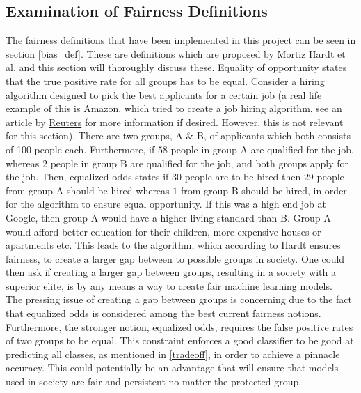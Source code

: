 \documentclass[11pt, fleqn, titlepage]{article}
\begin{document}
	\subsection{Examination of Fairness Definitions}\label{examination_of_fairness_definitions}
	The fairness definitions that have been implemented in this project can be seen in section \ref{bias_def}. These are definitions which are proposed by Mortiz Hardt et al. and this section will thoroughly discuss these. Equality of opportunity states that the true positive rate for all groups has to be equal. Consider a hiring algorithm designed to pick the best applicants for a certain job (a real life example of this is Amazon, which tried to create a job hiring algorithm, see an article by \href{https://www.reuters.com/article/us-amazon-com-jobs-automation-insight/amazon-scraps-secret-ai-recruiting-tool-that-showed-bias-against-women-idUSKCN1MK08G}{Reuters} for more information if desired. However, this is not relevant for this section). There are two groups, A \& B, of applicants which both consists of 100 people each. Furthermore, if $ 58 $ people in group A are qualified for the job, whereas $ 2 $ people in group B are qualified for the job, and both groups apply for the job. Then, equalized odds states if $ 30 $ people are to be hired then $ 29 $ people from group A should be hired whereas $ 1 $ from group B should be hired, in order for the algorithm to ensure equal opportunity. \cite{towardsdata} If this was a high end job at Google, then group A would have a higher living standard than B. Group A would afford better education for their children, more expensive houses or apartments etc. This leads to the algorithm, which according to Hardt ensures fairness, to create a larger gap between to possible groups in society. One could then ask if creating a larger gap between groups, resulting in a society with a superior elite, is by any means a way to create fair machine learning models. \newline
	\\
	\noindent 
	The pressing issue of creating a gap between groups is concerning due to the fact that equalized odds is considered among the best current fairness notions. Furthermore, the stronger notion, equalized odds, requires the false positive rates of two groups to be equal. This constraint enforces a good classifier to be good at predicting all classes, as mentioned in \ref{tradeoff}, in order to achieve a pinnacle accuracy. This could potentially be an advantage that will ensure that models used in society are fair and persistent no matter the protected group. 
	
\end{document}
